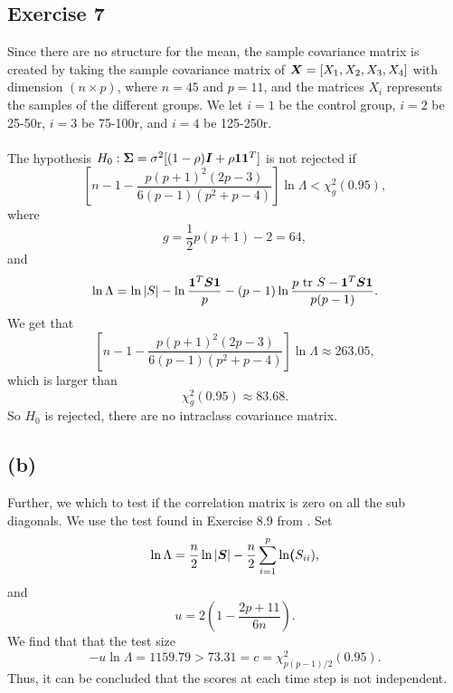 
\subsection*{Exercise 7}
\label{sec:exercise-7}

Since there are no structure for the mean, the sample covariance matrix
is created by taking the sample covariance matrix of $\bm{X} = [X_{1},
X_{2}, X_{3}, X_{4}]$ with dimension $(n \times p)$, where $n = 45$ and
$p= 11$, and the matrices $X_{i}$ represents the samples of the
different groups. We let $i = 1$ be the control group, $i = 2$ be
25-50r, $i = 3$ be 75-100r, and $i = 4$ be  125-250r. \\
\\
The hypothesis $H_{0}: \bm{\Sigma} = \sigma^{2}[(1-\rho)\bm{I} + \rho \bm{1}
\bm{1}^{T}]$ is not rejected if
\begin{equation*}
  \left[ n  - 1 - \frac{p(p+1)^2 (2p-3)}{6(p-1)(p^2+p-4)} \right] \ln
    \Lambda < \chi^{2}_{g}(0.95),
\end{equation*}
where 
\begin{equation*}
  g = \frac{1}{2}p(p+1) -2 = 64,
\end{equation*}
and
\begin{equation*}
 \ln\Lambda = \ln\left| S \right|- \ln\frac{\bm{1}^{T} \bm{S} \bm{1}}{p}  - (p-1)\ln\frac{p\text{ tr } S - \bm{1}^{T} \bm{S} \bm{1}}{p(p-1)}.
\end{equation*}
We get that
\begin{equation*}
  \left[ n  - 1 - \frac{p(p+1)^2 (2p-3)}{6(p-1)(p^2+p-4)} \right] \ln
    \Lambda \approx 263.05,
\end{equation*}
which is larger than
\begin{equation*}
  \chi^{2}_{g}(0.95) \approx 83.68.
\end{equation*}
So $H_{0}$ is rejected, there are no intraclass covariance matrix.

\subsection*{(b)}
\label{sec:b-6}

Further, we which to test if the correlation matrix is zero on all the
sub diagonals. We use the test found in Exercise 8.9 from \cite[p. 472]{book}. Set 
\begin{equation*}
  \ln \Lambda = \frac n2 \ln |\bm{S} |- \frac n2 \sum_{i = 1}^{p} \ln\bm{(}S_{ii}),
\end{equation*}
and 
\begin{equation*}
  u = 2\left(1 - \frac{2p + 11}{6n}\right).
\end{equation*}
We find that that the test size
\begin{equation*}
  -u \ln \Lambda = 1159.79  > 73.31 = c = \chi^2_{p(p-1)/2}(0.95).
\end{equation*}
Thus, it can be concluded that the scores at each time step is not
independent. 

